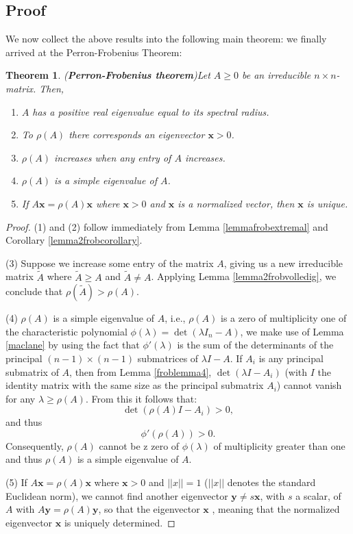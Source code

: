 \documentclass[a4paper,11pt]{report}
\newtheorem{theorem}{Theorem}[section]
\begin{document}
\subsection{Proof}
We now collect the above results into the following main theorem: we finally 
arrived at the Perron-Frobenius Theorem:
\begin{theorem}(\textbf{Perron-Frobenius theorem})\label{frobtheorem}
  Let $A \geq 0$ be an irreducible $n\times n$-matrix. Then,
  \begin{enumerate}
    \item $A$ has a positive real eigenvalue equal to its spectral radius.
    \item To $\rho(A)$ there corresponds an eigenvector $\mathbf{x} > 0$.
    \item $\rho(A)$ increases when any entry of $A$ increases.
    \item $\rho(A)$ is a simple eigenvalue of $A$.
    \item If $A\mathbf{x} = \rho(A)\mathbf{x}$ where $\mathbf{x} > 0$ and $\mathbf{x}$ 
    is a normalized vector, then $\mathbf{x}$ is unique.
    
  \end{enumerate}
  \end{theorem}
 \begin{proof}
  (1) and (2) follow immediately from Lemma \ref{lemmafrobextremal} and 
   Corollary \ref{lemma2frobcorollary}. 
   
  (3) Suppose we increase 
   some entry of the matrix $A$, giving us a new irreducible matrix $\tilde{A}$ 
   where $\tilde{A} \geq A$ and  $\tilde{A} \not = A$. Applying Lemma 
   \ref{lemma2frobvolledig}, we conclude that $\rho(\tilde{A}) > \rho(A).$ 
   
   (4) $\rho(A)$ is a simple eigenvalue of $A$, i.e., $\rho(A)$ is a zero of multiplicity one of the characteristic polynomial
   $\phi(\lambda) = \det(\lambda I_n - A)$, we make use of Lemma \ref{maclane} by using the fact that $\phi'(\lambda)$ is the sum of the
   determinants of the principal $(n-1)\times(n-1)$ submatrices of $\lambda I - A$. If $A_i$ is any principal submatrix of
   $A$, then from Lemma \ref{froblemma4}, $\det(\lambda I - A_i)$ (with $I$ the identity matrix with the same size as the principal submatrix $A_i$) cannot vanish 
   for any $\lambda \geq \rho(A)$. From this it follows that:
   $$\det(\rho(A)I - A_i) > 0,$$
   and thus
   $$\phi'(\rho(A)) > 0.$$
   Consequently, $\rho(A)$ cannot be z zero of $\phi(\lambda)$ of multiplicity 
   greater than one and thus $\rho(A)$ is a simple eigenvalue of $A$. 
   
  (5) If $A\mathbf{x} = \rho(A)\mathbf{x}$ where $\mathbf{x} > 0$ 
   and $||x|| = 1$ ($||x||$ denotes the standard Euclidean norm), we cannot find 
   another eigenvector $\mathbf{y} \not = s\mathbf{x}$, with $s$ a scalar, of $A$ 
   with $A\mathbf{y} = \rho(A)\mathbf{y}$, so that the eigenvector $\mathbf{x}$ 
   , meaning that the normalized eigenvector $\mathbf{x}$ is uniquely 
   determined.
       \end{proof}
\end{document}
